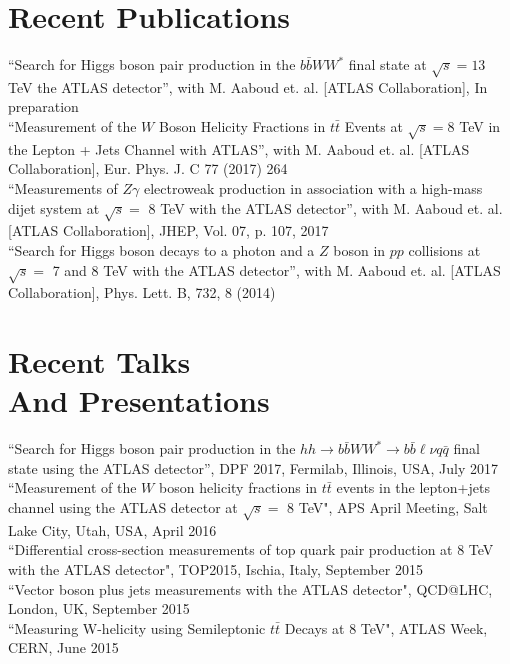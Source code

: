 \documentclass[margin,line]{res}
\begin{document}
\begin{resume}
\section{\sc Recent Publications}
``Search for Higgs boson pair production in the $b\bar{b}WW^*$ final state at $\sqrt{s}=13$ TeV the ATLAS detector'', with M. Aaboud et. al. [ATLAS Collaboration], In preparation\vspace{8pt} \\
``Measurement of the $W$ Boson Helicity Fractions in $t\bar{t}$ Events at $\sqrt{s}=8$ TeV in the Lepton + Jets Channel with ATLAS'', with M. Aaboud et. al. [ATLAS Collaboration], Eur. Phys. J. C 77 (2017) 264\vspace{8pt} \\
``Measurements of $Z\gamma$ electroweak production in association with a high-mass dijet system at $\sqrt{s}=$ 8 TeV with the ATLAS detector'', with M. Aaboud et. al. [ATLAS Collaboration], JHEP, Vol. 07, p. 107, 2017\vspace{8pt} \\
``Search for Higgs boson decays to a photon and a $Z$ boson in $pp$ collisions at $\sqrt{s}=$ 7 and 8 TeV with the ATLAS detector'', with M. Aaboud et. al. [ATLAS Collaboration], Phys. Lett. B, 732, 8 (2014)\vspace{8pt} \\
\vspace{-15pt}

\section{\sc Recent Talks\\ And Presentations}
``Search for Higgs boson pair production in the $hh\rightarrow b\bar{b}WW^*\rightarrow b\bar{b}\ell\nu q\bar{q}$ final state using the ATLAS detector'', DPF 2017, Fermilab, Illinois, USA, July 2017 \vspace{8pt}\\
``Measurement of the $W$ boson helicity fractions in $t\bar{t}$ events in the lepton+jets channel using the ATLAS detector at $\sqrt{s}=$ 8 TeV", APS April Meeting, Salt Lake City, Utah, USA, April 2016 \vspace{8pt}\\
``Differential cross-section measurements of top quark pair production at 8 TeV with the ATLAS detector", TOP2015, Ischia, Italy, September 2015 \vspace{8pt}\\
``Vector boson plus jets measurements with the ATLAS detector", QCD@LHC, London, UK, September 2015 \vspace{8pt}\\
``Measuring W-helicity using Semileptonic $t\bar{t}$ Decays at 8 TeV", ATLAS Week, CERN, June 2015 \\
\vspace{-10pt}


\end{resume}
\end{document}
